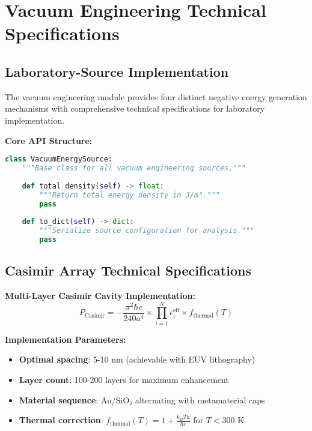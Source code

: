 \documentclass[11pt]{article}
\begin{document}
\section{Vacuum Engineering Technical Specifications}

\subsection{Laboratory-Source Implementation}

The vacuum engineering module provides four distinct negative energy generation mechanisms with comprehensive technical specifications for laboratory implementation.

\textbf{Core API Structure:}
\begin{lstlisting}[language=Python]
class VacuumEnergySource:
    """Base class for all vacuum engineering sources."""
    
    def total_density(self) -> float:
        """Return total energy density in J/m³."""
        pass
    
    def to_dict(self) -> dict:
        """Serialize source configuration for analysis."""
        pass
\end{lstlisting}

\subsection{Casimir Array Technical Specifications}

\textbf{Multi-Layer Casimir Cavity Implementation:}
\begin{equation}
P_{\text{Casimir}} = -\frac{\pi^2 \hbar c}{240 a^4} \times \prod_{i=1}^N \epsilon_i^{\text{eff}} \times f_{\text{thermal}}(T)
\end{equation}

\textbf{Implementation Parameters:}
\begin{itemize}
    \item \textbf{Optimal spacing}: 5-10 nm (achievable with EUV lithography)
    \item \textbf{Layer count}: 100-200 layers for maximum enhancement
    \item \textbf{Material sequence}: Au/SiO₂ alternating with metamaterial caps
    \item \textbf{Thermal correction}: $f_{\text{thermal}}(T) = 1 + \frac{k_B T a}{\hbar c}$ for $T < 300$ K
\end{itemize}
\end{document}
